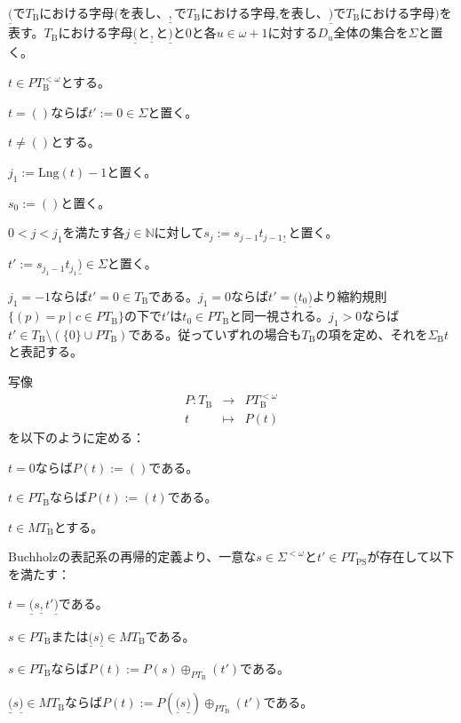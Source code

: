 \documentclass[dvipdfmx,uplatex]{jsarticle}
\theoremstyle{customnonumberbreakfortheorem}
\theoremstyle{customnonumberbreakforproof}
\begin{document}
\(\underline{(}\)で\(T_{\textrm{B}}\)における字母\(\textrm{(}\)を表し、\(\underline{,}\)で\(T_{\textrm{B}}\)における字母\(\textrm{,}\)を表し、\(\underline{)}\)で\(T_{\textrm{B}}\)における字母\(\textrm{)}\)を表す。\(T_{\textrm{B}}\)における字母\(\underline{(}\)と\(\underline{,}\)と\(\underline{)}\)と\(0\)と各\(u \in \omega+1\)に対する\(D_u\)全体の集合を\(\Sigma\)と置く。

\(t \in PT_{\textrm{B}}^{< \omega}\)とする。
\begin{nenumerate}
	\item \(t = ()\)ならば\(t' := 0 \in \Sigma\)と置く。
	\item \(t \neq ()\)とする。
	\begin{nenumerate}
		\item \(j_1 := \textrm{Lng}(t)-1\)と置く。
		\item \(s_0 := ()\)と置く。
		\item \(0 < j < j_1\)を満たす各\(j \in \mathbb{N}\)に対して\(s_j := s_{j-1} t_{j-1} \underline{,}\)と置く。
		\item \(t' := s_{j_1-1} t_{j_1} \underline{)} \in \Sigma\)と置く。
	\end{nenumerate}
\end{nenumerate}
\(j_1 = -1\)ならば\(t' = 0 \in T_{\textrm{B}}\)である。\(j_1 = 0\)ならば\(t' = \underline{(} t_0 \underline{)}\)より縮約規則\(\{(p) = p \mid c \in PT_{\textrm{B}}\}\)の下で\(t'\)は\(t_0 \in PT_{\textrm{B}}\)と同一視される。\(j_1 > 0\)ならば\(t' \in T_{\textrm{B}} \setminus (\{0\} \cup PT_{\textrm{B}})\)である。従っていずれの場合も\(T_{\textrm{B}}\)の項を定め、それを\(\Sigma_{\textrm{B}} t\)と表記する。

写像
\begin{eqnarray*}
P \colon T_{\textrm{B}} & \to & PT_{\textrm{B}}^{< \omega} \\
t & \mapsto & P(t)
\end{eqnarray*}
を以下のように定める：
\begin{nenumerate}
	\item \(t = 0\)ならば\(P(t) := ()\)である。
	\item \(t \in PT_{\textrm{B}}\)ならば\(P(t) := (t)\)である。
	\item \(t \in MT_{\textrm{B}}\)とする。
	\begin{nenumerate}
		\item Buchholzの表記系の再帰的定義より、一意な\(s \in \Sigma^{<\omega}\)と\(t' \in PT_{\textrm{PS}}\)が存在して以下を満たす：
		\begin{nenumerate}
			\item \(t = \underline{(} s \underline{,} t' \underline{)}\)である。
			\item \(s \in PT_{\textrm{B}}\)または\(\underline{(} s \underline{)} \in MT_{\textrm{B}}\)である。
		\end{nenumerate}
		\item \(s \in PT_{\textrm{B}}\)ならば\(P(t) := P(s) \oplus_{PT_{\textrm{B}}} (t')\)である。
		\item \(\underline{(} s \underline{)} \in MT_{\textrm{B}}\)ならば\(P(t) := P(\underline{(} s \underline{)}) \oplus_{PT_{\textrm{B}}} (t')\)である。
	\end{nenumerate}
\end{nenumerate}
\end{document}
